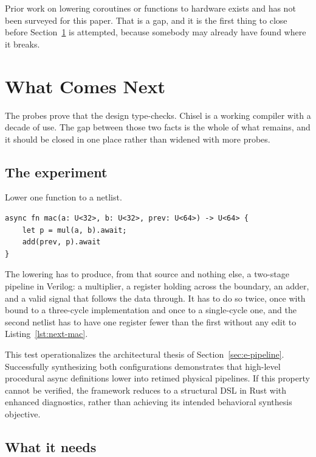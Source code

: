 Prior work on lowering coroutines or  functions to hardware
exists and has not been surveyed for this paper. That is a gap, and it is
the first thing to close before Section~\ref{sec:e-next} is attempted,
because somebody may already have found where it breaks.

\section{What Comes Next}
\label{sec:e-next}

The probes prove that the design type-checks. Chisel is a working
compiler with a decade of use. The gap between those two facts is the
whole of what remains, and it should be closed in one place rather than
widened with more probes.

\subsection{The experiment}

Lower one function to a netlist.

\begin{lstlisting}[caption={The function to lower. Two operators, two awaits, one value live across a boundary.},label={lst:next-mac}]
async fn mac(a: U<32>, b: U<32>, prev: U<64>) -> U<64> {
    let p = mul(a, b).await;
    add(prev, p).await
}
\end{lstlisting}

The lowering has to produce, from that source and nothing else, a
two-stage pipeline in Verilog: a multiplier, a register holding 
across the boundary, an adder, and a valid signal that follows the data
through. It has to do so twice, once with  bound to a
three-cycle implementation and once to a single-cycle one, and the second
netlist has to have one register fewer than the first without any edit to
Listing~\ref{lst:next-mac}.

This test operationalizes the architectural thesis of
Section~\ref{sec:e-pipeline}. Successfully synthesizing both configurations
demonstrates that high-level procedural async definitions lower into retimed
physical pipelines. If this property cannot be verified, the framework
reduces to a structural DSL in Rust with enhanced diagnostics, rather than
achieving its intended behavioral synthesis objective.

\subsection{What it needs}

